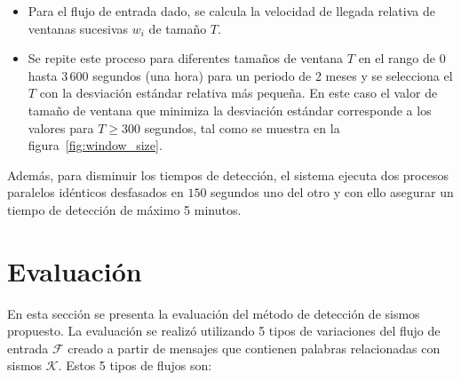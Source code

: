 	\begin{itemize}
	\item Para el flujo de entrada dado, se calcula la velocidad de llegada relativa de ventanas sucesivas $w_i$ de tamaño $T$.

	\item Se repite este proceso para diferentes tamaños de ventana $T$ en el rango de $0$ hasta $3\,600$ segundos (una hora) para un periodo de 2 meses y se selecciona el $T$ con la desviación estándar relativa más pequeña. En este caso el valor de tamaño de ventana que minimiza la desviación estándar corresponde a los valores para $T \geq 300$ segundos, tal como se muestra en la figura~\ref{fig:window_size}.

	\end{itemize}

	Además, para disminuir los tiempos de detección, el sistema ejecuta dos procesos paralelos idénticos desfasados en $150$ segundos uno del otro y con ello asegurar un tiempo de detección de máximo 5 minutos. 

		
\section{Evaluación}

En esta sección se presenta la evaluación del método de detección de sismos propuesto. La evaluación se realizó utilizando 5 tipos de variaciones del flujo de entrada $\mathcal{F}$ creado a partir de mensajes que contienen palabras relacionadas con sismos $\mathcal{K}$. Estos 5 tipos de flujos son:

